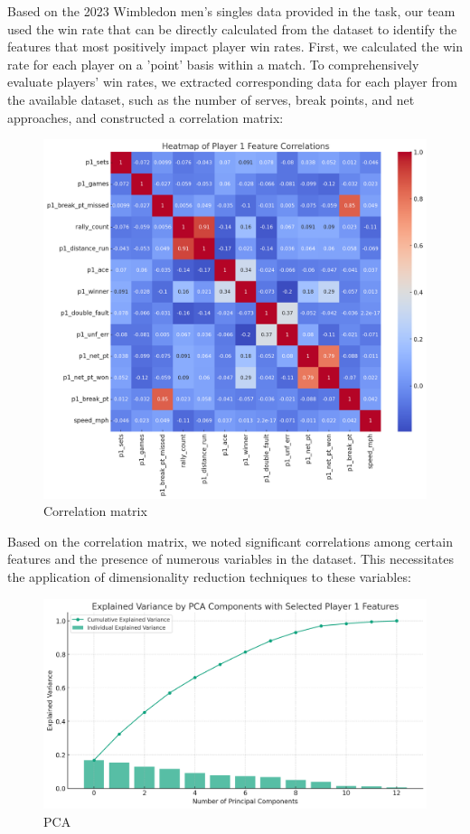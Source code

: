 \documentclass[12pt]{article}  %
\begin{document}
Based on the 2023 Wimbledon men's singles data provided in the task, 
our team used the win rate that can be directly calculated from the dataset to identify the features 
that most positively impact player win rates. First, we calculated the win rate for each player on a 'point' basis within a match. 
To comprehensively evaluate players' win rates, we extracted corresponding data for each player from the available dataset, 
such as the number of serves, break points, and net approaches, and constructed a correlation matrix:
\begin{figure}[htbp]  %
    \centering  %
    \includegraphics[width=.6\textwidth]{1.png} %
    \caption{Correlation matrix} %
\end{figure}

Based on the correlation matrix, we noted significant correlations among certain features 
and the presence of numerous variables in the dataset. 
This necessitates the application of dimensionality reduction techniques to these variables:
\begin{figure}[htbp]  %
    \centering  %
    \includegraphics[width=.7\textwidth]{2.png} %
    \caption{PCA} %
\end{figure}
\end{document}

